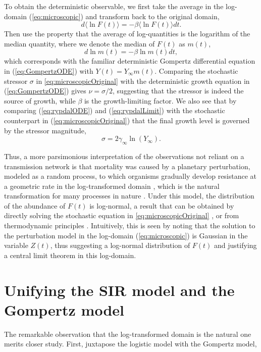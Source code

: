 \documentclass{article}
\begin{document}
To obtain the deterministic observable, we first take the average in the log-domain (\ref{eq:microscopic}) and transform back to the original domain, 
\begin{equation}
d\langle\ln{F(t)}\rangle = -\beta \langle\ln{F(t)}\rangle dt.
\end{equation}
Then use the property that the average of log-quantities is the logarithm of the median quantity, where we denote the median of $F(t)$ as $m(t)$, 
\begin{equation}
\label{eq:medianGomp}
d\ln{m(t)} = -\beta \ln{m(t)} dt,
\end{equation}
which corresponds with the familiar deterministic Gompertz differential equation in (\ref{eq:GompertzODE}) with $Y(t) = Y_\infty m(t)$. 
Comparing the stochastic stressor $\sigma$ in \ref{eq:microscopicOriginal} with the deterministic growth equation in (\ref{eq:GompertzODE}) gives $\nu=\sigma/2$, suggesting that the stressor is indeed the source of growth, while $\beta$ is the growth-limiting factor. 
We also see that by comparing (\ref{eq:rypdalODE}) and (\ref{eq:rypdalLimit}) with the stochastic counterpart in (\ref{eq:microscopicOriginal}) that the final growth level is governed by the stressor magnitude,
\begin{equation}
\sigma = 2\gamma_{\infty}\ln{(Y_{\infty})}.
\end{equation}

Thus, a more parsimonious interpretation of the observations not reliant on a transmission network is that mortality was caused by a planetary perturbation, modeled as a random process, to which organisms gradually develop resistance at a geometric rate in the log-transformed domain \citep{boxenbaum2017hypotheses,neafsey1988gompertz}, which is the natural transformation for many processes in nature \citep{zhang1994log}. 
Under this model, the distribution of the abundance of $F(t)$ is log-normal, a result that can be obtained by directly solving the stochastic equation in \ref{eq:microscopicOriginal} \citep{skiadas2010exact,petroni2020gompertz}, or from thermodynamic principles \citep{sitaram1984statistical,gunasekaran1982lon}. 
Intuitively, this is seen by noting that the solution to the perturbation model in the log-domain (\ref{eq:microscopic}) is Gaussian in the variable $Z(t)$, thus suggesting a log-normal distribution of $F(t)$ and justifying a central limit theorem in this log-domain.

\section{Unifying the SIR model and the Gompertz model}
The remarkable observation that the log-transformed domain is the natural one merits closer study. First, juxtapose the logistic model with the Gompertz model,
\end{document}
